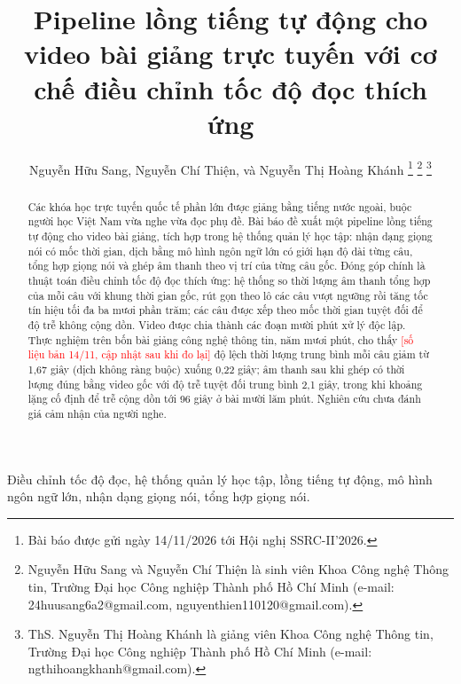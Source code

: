 \documentclass{IEEEtran}
\newcommand{\todo}[1]{\textcolor{red}{[#1]}}
\begin{document}
\title{Pipeline lồng tiếng tự động cho video bài giảng trực tuyến với cơ chế điều chỉnh tốc độ đọc thích ứng}

\author{Nguyễn Hữu Sang, Nguyễn Chí Thiện, và Nguyễn Thị Hoàng Khánh
\thanks{Bài báo được gửi ngày 14/11/2026 tới Hội nghị SSRC-II'2026.}
\thanks{Nguyễn Hữu Sang và Nguyễn Chí Thiện là sinh viên Khoa Công nghệ Thông tin, Trường Đại học Công nghiệp Thành phố Hồ Chí Minh (e-mail: 24huusang6a2@gmail.com, nguyenthien110120@gmail.com).}
\thanks{ThS. Nguyễn Thị Hoàng Khánh là giảng viên Khoa Công nghệ Thông tin, Trường Đại học Công nghiệp Thành phố Hồ Chí Minh (e-mail: ngthihoangkhanh@gmail.com).}}

\maketitle

\begin{abstract}
Các khóa học trực tuyến quốc tế phần lớn được giảng bằng tiếng nước ngoài, buộc người học Việt Nam vừa nghe vừa đọc phụ đề. Bài báo đề xuất một pipeline lồng tiếng tự động cho video bài giảng, tích hợp trong hệ thống quản lý học tập: nhận dạng giọng nói có mốc thời gian, dịch bằng mô hình ngôn ngữ lớn có giới hạn độ dài từng câu, tổng hợp giọng nói và ghép âm thanh theo vị trí của từng câu gốc. Đóng góp chính là thuật toán điều chỉnh tốc độ đọc thích ứng: hệ thống so thời lượng âm thanh tổng hợp của mỗi câu với khung thời gian gốc, rút gọn theo lô các câu vượt ngưỡng rồi tăng tốc tín hiệu tối đa ba mươi phần trăm; các câu được xếp theo mốc thời gian tuyệt đối để độ trễ không cộng dồn. Video được chia thành các đoạn mười phút xử lý độc lập. Thực nghiệm trên bốn bài giảng công nghệ thông tin, năm mươi phút, cho thấy \todo{số liệu bản 14/11, cập nhật sau khi đo lại} độ lệch thời lượng trung bình mỗi câu giảm từ 1,67 giây (dịch không ràng buộc) xuống 0,22 giây; âm thanh sau khi ghép có thời lượng đúng bằng video gốc với độ trễ tuyệt đối trung bình 2,1 giây, trong khi khoảng lặng cố định để trễ cộng dồn tới 96 giây ở bài mười lăm phút. Nghiên cứu chưa đánh giá cảm nhận của người nghe.
\end{abstract}

\begin{IEEEkeywords}
Điều chỉnh tốc độ đọc, hệ thống quản lý học tập, lồng tiếng tự động, mô hình ngôn ngữ lớn, nhận dạng giọng nói, tổng hợp giọng nói.
\end{IEEEkeywords}

\end{document}
